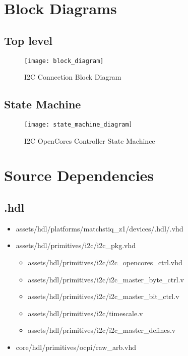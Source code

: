 \section*{Block Diagrams}
\subsection*{Top level}
\begin{figure}[ht]
	\centerline{\texttt{[image: block\_diagram]}}
	\caption{I2C Connection Block Diagram}
	\label{fig:tb}
\end{figure}
\subsection*{State Machine}
\begin{figure}[ht]
	\centerline{\texttt{[image: state\_machine\_diagram]}}
	\caption{I2C OpenCores Controller State Machince}
	\label{fig:tb}
\end{figure}

\section*{Source Dependencies}
\subsection*{\comp.hdl}
\begin{itemize}
	\item assets/hdl/platforms/matchstiq\_z1/devices/\comp.hdl/\comp.vhd
	\item assets/hdl/primitives/i2c/i2c\_pkg.vhd
	      \begin{itemize}
	      	\item assets/hdl/primitives/i2c/i2c\_opencores\_ctrl.vhd
	      	\item assets/hdl/primitives/i2c/i2c\_master\_byte\_ctrl.v
	      	\item assets/hdl/primitives/i2c/i2c\_master\_bit\_ctrl.v
	      	\item assets/hdl/primitives/i2c/timescale.v
	      	\item assets/hdl/primitives/i2c/i2c\_master\_defines.v
	      \end{itemize}
	\item core/hdl/primitives/ocpi/raw\_arb.vhd
\end{itemize}

